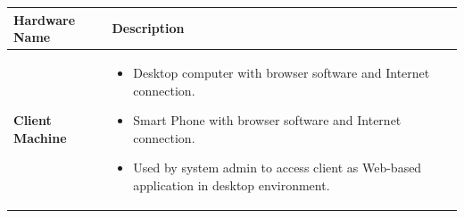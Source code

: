 \begin{center}
\setlength{\tabcolsep}{0.8cm}
\renewcommand{\arraystretch}{1.2}
        \centering
        \begin{longtable}{|m{90pt}|p{9cm}|}
            \hline
                \textbf{Hardware Name} &\textbf{ Description}\\
            \hline
                \textbf{Client Machine} &
                    \begin{itemize}
                        \item Desktop computer with browser software and Internet connection.
                        \item Smart Phone with browser software and Internet connection.
                        \item Used by system admin to access client as Web-based application in desktop  environment.
                    \end{itemize} \\
            \hline
        \end{longtable}
\end{center}




